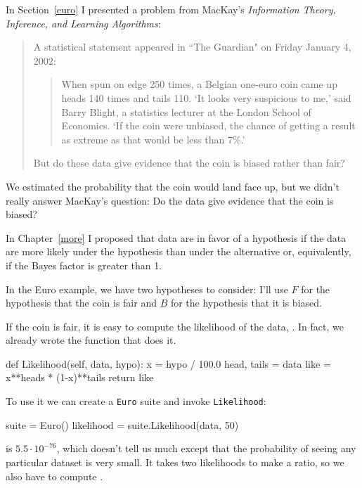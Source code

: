 \documentclass[12pt]{book}
\theoremstyle{exercise}
\begin{document}
In Section~\ref{euro} I presented a problem from MacKay's {\it Information
  Theory, Inference, and Learning Algorithms}:

\begin{quote}
A statistical statement appeared in ``The Guardian" on Friday January 4, 2002:

  \begin{quote}
        When spun on edge 250 times, a Belgian one-euro coin came
        up heads 140 times and tails 110.  `It looks very suspicious
        to me,' said Barry Blight, a statistics lecturer at the London
        School of Economics.  `If the coin were unbiased, the chance of
        getting a result as extreme as that would be less than 7\%.'
        \end{quote}

But do these data give evidence that the coin is biased rather than fair?
\end{quote}

We estimated the probability that the coin would
land face up, but we didn't really answer MacKay's question:
Do the data give evidence that the coin is biased?

In Chapter~\ref{more} I proposed that data are in favor of
a hypothesis if the data are more likely under the hypothesis than
under the alternative or, equivalently, if the Bayes factor is greater
than 1.

In the Euro example, we have two hypotheses to consider: I'll use
$F$ for the hypothesis that the coin is fair and $B$ for the hypothesis
that it is biased.

If the coin is fair, it is easy to compute the likelihood of the
data, .  In fact, we already wrote the function
that does it.

\begin{code}
    def Likelihood(self, data, hypo):
        x = hypo / 100.0
        head, tails = data
        like = x**heads * (1-x)**tails
        return like
\end{code}

To use it we can
create a {\tt Euro} suite and invoke
{\tt Likelihood}:

\begin{code}
    suite = Euro()
    likelihood = suite.Likelihood(data, 50)
\end{code}

 is $5.5 \cdot 10^{-76}$, which doesn't tell us much except
that the probability of seeing any particular dataset is very small.
It takes two likelihoods to make a ratio, so we also have to
compute .
\end{document}

